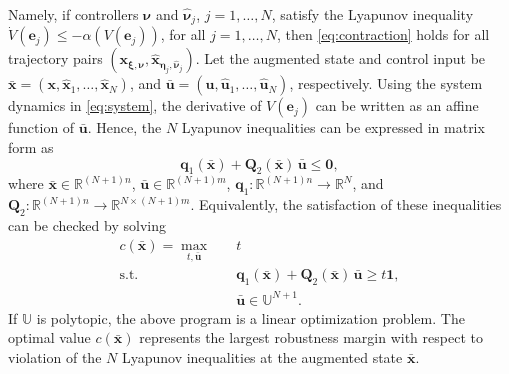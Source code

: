 Namely, if controllers $\boldsymbol{\nu}$ and $\hat{\boldsymbol{\nu}}_j$, $j = 1, \dots, N$, satisfy the Lyapunov inequality $\dot V(\mathbf{e}_j) \le -\alpha(V(\mathbf{e}_j))$, for all $j = 1, \dots, N$, then \eqref{eq:contraction} holds for all trajectory pairs $(\mathbf{x}_{\boldsymbol{\xi},\boldsymbol{\nu}}, \hat{\mathbf{x}}_{\boldsymbol{\eta}_j,\hat{\boldsymbol{\nu}}_j})$. Let the augmented state and control input be $\bar{\mathbf{x}} = (\mathbf{x}, \hat{\mathbf{x}}_1, \dots, \hat{\mathbf{x}}_N)$, and $\bar{\mathbf{u}} =
(\mathbf{u},\hat{\mathbf{u}}_1,\dots,\hat{\mathbf{u}}_N)$, respectively.
Using the system dynamics in \eqref{eq:system}, the derivative of $V(\mathbf{e}_j)$ can be written as an affine function of $\bar{\mathbf{u}}$. Hence, the $N$ Lyapunov inequalities can be expressed in matrix form as
\[
    \mathbf{q}_1(\bar{\mathbf{x}}) + \mathbf{Q}_2(\bar{\mathbf{x}}) \, \bar{\mathbf{u}} \le \mathbf{0},
\]
where $\bar{\mathbf{x}} \in \mathbb{R}^{(N+1) n}$, $\bar{\mathbf{u}} \in \mathbb{R}^{(N+1) m}$, $\mathbf{q}_1:\mathbb{R}^{(N+1)n} \to \mathbb{R}^N$, and $\mathbf{Q}_2: \mathbb{R}^{(N+1) n} \to \mathbb{R}^{N \times (N+1) m}$. Equivalently, the satisfaction of these inequalities can be checked by solving
\begin{equation} \label{eq:qp2}
    \begin{aligned}
        c(\bar{\mathbf{x}}) = \max_{t, \bar{\mathbf{u}}} \quad & t \\
        \text{s.t.} \quad & \mathbf{q}_1(\bar{\mathbf{x}}) + \mathbf{Q}_2(\bar{\mathbf{x}}) \, \bar{\mathbf{u}}
        \ge t\mathbf{1}, \\
        & \bar{\mathbf{u}} \in \mathbb{U}^{N+1}.
    \end{aligned}
\end{equation}
If $\mathbb{U}$ is polytopic, the above program is a linear optimization problem. The optimal value $c(\bar{\mathbf{x}})$ represents the largest robustness margin with respect to violation of the $N$ Lyapunov inequalities at the augmented state $\bar{\mathbf{x}}$.

